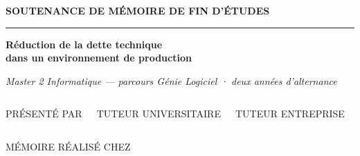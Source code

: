 \begin{frame}[plain]
  \vspace*{1.6cm}
  {\bfseries\fontsize{9}{9}\selectfont\textcolor{accent}{\MakeUppercase{Soutenance de mémoire de fin d'études}}\par}
  \vspace*{0.30cm}
  {\color{accent}\rule{1.8cm}{2.6pt}}\par
  \vspace*{0.45cm}
  {\seriffont\bfseries\fontsize{27}{31}\selectfont\textcolor{ink}%
    {Réduction de la dette technique\\ dans un environnement de production}\par}
  \vspace*{0.28cm}
  {\seriffont\itshape\fontsize{14}{18}\selectfont\textcolor{stone}%
    {Master 2 Informatique — parcours Génie Logiciel · deux années d'alternance}\par}
  \vspace*{0.85cm}
  \begin{columns}[t]
      {\fontsize{7.5}{9}\selectfont\textcolor{muted}{\MakeUppercase{Présenté par}}\par}
      \vspace{2pt}{\bfseries\fontsize{11}{13}\selectfont\textcolor{ink}{Jérémy Hurel}}
      {\fontsize{7.5}{9}\selectfont\textcolor{muted}{\MakeUppercase{Tuteur universitaire}}\par}
      \vspace{2pt}{\fontsize{11}{13}\selectfont\textcolor{ink2}{Mickaël Montassier — Univ.\ de Montpellier}}
      {\fontsize{7.5}{9}\selectfont\textcolor{muted}{\MakeUppercase{Tuteur entreprise}}\par}
      \vspace{2pt}{\fontsize{11}{13}\selectfont\textcolor{ink2}{David Desmarest — Free · Beemo}}
  \end{columns}
  \vspace{0.85cm}
  {\fontsize{7.5}{9}\selectfont\textcolor{muted}{\MakeUppercase{Mémoire réalisé chez}}\par}
  \vspace{0.24cm}
\end{frame}
